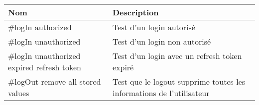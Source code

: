 \begin{tabular}{P{0.3\textwidth}P{0.6\textwidth}}
\hline
\bf Nom
&
\bf Description
\\
\hline
\hline
\#logIn authorized
&
Test d'un login autorisé
\\
\#logIn unauthorized
&
Test d'un login non autorisé
\\
\#logIn unauthorized expired refresh token
&
Test d'un login avec un refresh token expiré
\\
\#logOut remove all stored values
&
Test que le logout supprime toutes les informations de l'utilisateur
\\
\hline
\end{tabular}